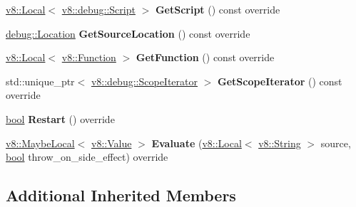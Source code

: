 \begin{DoxyCompactItemize}
\item 
\mbox{\label{classv8_1_1internal_1_1DebugStackTraceIterator_a19f19fc0effa871d3131b9610bb74d70}} 
\mbox{\hyperlink{classv8_1_1Local}{v8\+::\+Local}}$<$ \mbox{\hyperlink{classv8_1_1debug_1_1Script}{v8\+::debug\+::\+Script}} $>$ {\bfseries Get\+Script} () const override
\item 
\mbox{\label{classv8_1_1internal_1_1DebugStackTraceIterator_aceb83dc0511cd7b43d9e6aeb6c97d99e}} 
\mbox{\hyperlink{classv8_1_1debug_1_1Location}{debug\+::\+Location}} {\bfseries Get\+Source\+Location} () const override
\item 
\mbox{\label{classv8_1_1internal_1_1DebugStackTraceIterator_a196cfc91b9d0888781a9d03603f2f5a5}} 
\mbox{\hyperlink{classv8_1_1Local}{v8\+::\+Local}}$<$ \mbox{\hyperlink{classv8_1_1Function}{v8\+::\+Function}} $>$ {\bfseries Get\+Function} () const override
\item 
\mbox{\label{classv8_1_1internal_1_1DebugStackTraceIterator_a7d2843ea84bde1c1700b0fcb37f50538}} 
std\+::unique\+\_\+ptr$<$ \mbox{\hyperlink{classv8_1_1debug_1_1ScopeIterator}{v8\+::debug\+::\+Scope\+Iterator}} $>$ {\bfseries Get\+Scope\+Iterator} () const override
\item 
\mbox{\label{classv8_1_1internal_1_1DebugStackTraceIterator_afe0ede5b52fb1a97244c561632b766dc}} 
\mbox{\hyperlink{classbool}{bool}} {\bfseries Restart} () override
\item 
\mbox{\label{classv8_1_1internal_1_1DebugStackTraceIterator_ab342197fcebd314afb384c95c7c98e6c}} 
\mbox{\hyperlink{classv8_1_1MaybeLocal}{v8\+::\+Maybe\+Local}}$<$ \mbox{\hyperlink{classv8_1_1Value}{v8\+::\+Value}} $>$ {\bfseries Evaluate} (\mbox{\hyperlink{classv8_1_1Local}{v8\+::\+Local}}$<$ \mbox{\hyperlink{classv8_1_1String}{v8\+::\+String}} $>$ source, \mbox{\hyperlink{classbool}{bool}} throw\+\_\+on\+\_\+side\+\_\+effect) override
\end{DoxyCompactItemize}
\subsection*{Additional Inherited Members}


